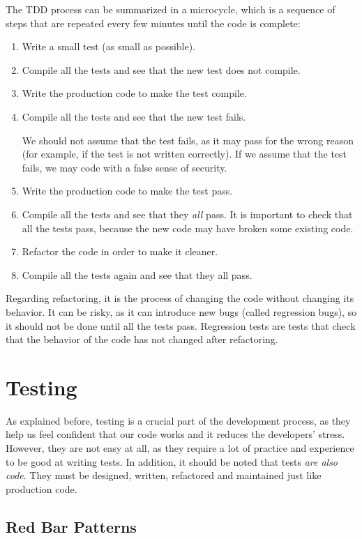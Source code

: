 The TDD process can be summarized in a microcycle, which is a sequence of steps that are repeated every few minutes until the code is complete:
\begin{enumerate}
    \item Write a small test (as small as possible).
    \item Compile all the tests and see that the new test does not compile.
    \item Write the production code to make the test compile.
    \item Compile all the tests and see that the new test fails.
    
    We should not assume that the test fails, as it may pass for the wrong reason (for example, if the test is not written correctly). If we assume that the test fails, we may code with a false sense of security.
    \item Write the production code to make the test pass.
    \item Compile all the tests and see that they \emph{all} pass. It is important to check that all the tests pass, because the new code may have broken some existing code.
    \item Refactor the code in order to make it cleaner.
    \item Compile all the tests again and see that they all pass.
\end{enumerate}

Regarding refactoring, it is the process of changing the code without changing its behavior. It can be risky, as it can introduce new bugs (called regression bugs), so it should not be done until all the tests pass. Regression tests are tests that check that the behavior of the code has not changed after refactoring.

\section{Testing}

As explained before, testing is a crucial part of the development process, as they help us feel confident that our code works and it reduces the developers' stress. However, they are not easy at all, as they require a lot of practice and experience to be good at writing tests. In addition, it should be noted that tests \emph{are also code}. They must be designed, written, refactored and maintained just like production code.

\subsection{Red Bar Patterns}

